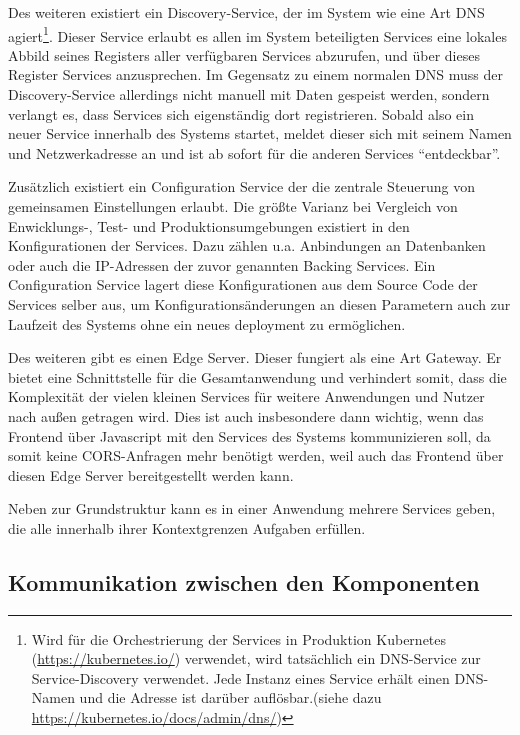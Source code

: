 \documentclass[12pt,a4paper,bibliography=totocnumbered,listof=totocnumbered]{scrartcl}
\begin{document}
Des weiteren existiert ein Discovery-Service, der im System wie eine Art \acs{DNS} agiert\footnote{Wird für die Orchestrierung der Services in Produktion Kubernetes (\url{https://kubernetes.io/}) verwendet, wird tatsächlich ein DNS-Service zur Service-Discovery verwendet. Jede Instanz eines Service erhält einen DNS-Namen und die Adresse ist darüber auflösbar.(siehe dazu \url{https://kubernetes.io/docs/admin/dns/})}. Dieser Service erlaubt es allen im System beteiligten Services eine lokales Abbild seines Registers aller verfügbaren Services abzurufen, und über dieses Register Services anzusprechen. Im Gegensatz zu einem normalen \ac{DNS} muss der Discovery-Service allerdings nicht manuell mit Daten gespeist werden, sondern verlangt es, dass Services sich eigenständig dort registrieren. Sobald also ein neuer Service innerhalb des Systems startet, meldet dieser sich mit seinem Namen und Netzwerkadresse an und ist ab sofort für die anderen Services \enquote{entdeckbar}.

Zusätzlich existiert ein Configuration Service der die zentrale Steuerung von gemeinsamen Einstellungen erlaubt. Die größte Varianz bei Vergleich von Enwicklungs-, Test- und Produktionsumgebungen existiert in den Konfigurationen der Services. Dazu zählen u.a. Anbindungen an Datenbanken oder auch die IP-Adressen der zuvor genannten Backing Services\cite{wiggins}. Ein Configuration Service lagert diese Konfigurationen aus dem Source Code der Services selber aus, um Konfigurationsänderungen an diesen Parametern auch zur Laufzeit des Systems ohne ein neues deployment zu ermöglichen.

Des weiteren gibt es einen Edge Server. Dieser fungiert als eine Art Gateway. Er bietet eine Schnittstelle für die Gesamtanwendung und verhindert somit, dass die Komplexität der vielen kleinen Services für weitere Anwendungen und Nutzer nach außen getragen wird. Dies ist auch insbesondere dann wichtig, wenn das Frontend über Javascript mit den Services des Systems kommunizieren soll, da somit keine \ac{CORS}-Anfragen mehr benötigt werden, weil auch das Frontend über diesen Edge Server bereitgestellt werden kann.

Neben zur Grundstruktur kann es in einer Anwendung mehrere Services geben, die alle innerhalb ihrer Kontextgrenzen Aufgaben erfüllen. 


\subsection{Kommunikation zwischen den Komponenten}
\end{document}
